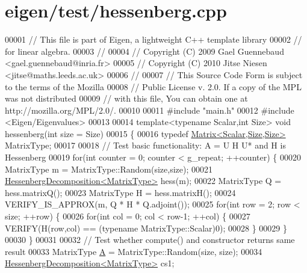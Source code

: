 \hypertarget{eigen_2test_2hessenberg_8cpp_source}{}\section{eigen/test/hessenberg.cpp}
\label{eigen_2test_2hessenberg_8cpp_source}

\begin{DoxyCode}
00001 \textcolor{comment}{// This file is part of Eigen, a lightweight C++ template library}
00002 \textcolor{comment}{// for linear algebra.}
00003 \textcolor{comment}{//}
00004 \textcolor{comment}{// Copyright (C) 2009 Gael Guennebaud <gael.guennebaud@inria.fr>}
00005 \textcolor{comment}{// Copyright (C) 2010 Jitse Niesen <jitse@maths.leeds.ac.uk>}
00006 \textcolor{comment}{//}
00007 \textcolor{comment}{// This Source Code Form is subject to the terms of the Mozilla}
00008 \textcolor{comment}{// Public License v. 2.0. If a copy of the MPL was not distributed}
00009 \textcolor{comment}{// with this file, You can obtain one at http://mozilla.org/MPL/2.0/.}
00010 
00011 \textcolor{preprocessor}{#include "main.h"}
00012 \textcolor{preprocessor}{#include <Eigen/Eigenvalues>}
00013 
00014 \textcolor{keyword}{template}<\textcolor{keyword}{typename} Scalar,\textcolor{keywordtype}{int} Size> \textcolor{keywordtype}{void} hessenberg(\textcolor{keywordtype}{int} size = Size)
00015 \{
00016   \textcolor{keyword}{typedef} \hyperlink{group___core___module_class_eigen_1_1_matrix}{Matrix<Scalar,Size,Size>} MatrixType;
00017 
00018   \textcolor{comment}{// Test basic functionality: A = U H U* and H is Hessenberg}
00019   \textcolor{keywordflow}{for}(\textcolor{keywordtype}{int} counter = 0; counter < g\_repeat; ++counter) \{
00020     MatrixType m = MatrixType::Random(size,size);
00021     \hyperlink{group___eigenvalues___module}{HessenbergDecomposition<MatrixType>} hess(m);
00022     MatrixType Q = hess.matrixQ();
00023     MatrixType H = hess.matrixH();
00024     VERIFY\_IS\_APPROX(m, Q * H * Q.adjoint());
00025     \textcolor{keywordflow}{for}(\textcolor{keywordtype}{int} row = 2; row < size; ++row) \{
00026       \textcolor{keywordflow}{for}(\textcolor{keywordtype}{int} col = 0; col < row-1; ++col) \{
00027     VERIFY(H(row,col) == (\textcolor{keyword}{typename} MatrixType::Scalar)0);
00028       \}
00029     \}
00030   \}
00031 
00032   \textcolor{comment}{// Test whether compute() and constructor returns same result}
00033   MatrixType \hyperlink{group___core___module_class_eigen_1_1_matrix}{A} = MatrixType::Random(size, size);
00034   \hyperlink{group___eigenvalues___module}{HessenbergDecomposition<MatrixType>} cs1;

\end{DoxyCode}
